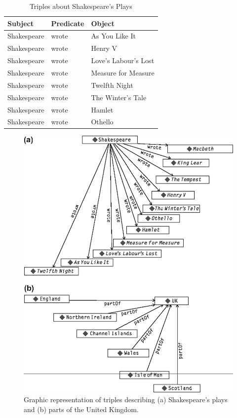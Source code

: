 \begin{table}[h]
\centering
\begin{tabular}{||l l l||} 
 \hline
 Subject&Predicate&Object \\ [0.5ex] 
 \hline\hline
Shakespeare&wrote&As You Like It\\
Shakespeare&wrote&Henry V\\
Shakespeare&wrote&Love's Labour's Lost \\
Shakespeare&wrote&Measure for Measure \\
Shakespeare&wrote&Twelfth Night \\
Shakespeare&wrote&The Winter's Tale \\
Shakespeare&wrote&Hamlet\\
Shakespeare&wrote&Othello\\
\hline
\end{tabular}
\caption{Triples about Shakespeare's Plays}
\label{tab:ch3.4}
\end{table}


\begin{figure}
    \centering
    \includegraphics[width=5.0in]{media/ch3/f03-05ab-9780123859655.eps}
    \caption{Graphic representation of triples describing (a) Shakespeare’s plays and (b) parts of the United Kingdom.}
    \label{fig:ch3.5}
\end{figure}


